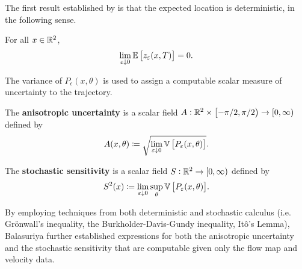 The first result established by \cite{Balasuriya_2020_StochasticSensitivityComputable} is that the expected location is deterministic, in the following sense.
\begin{theorem}
	For all \(x \in \mathbb{R}^2\),
	\[
		\lim_{\varepsilon\downarrow 0}\mathbb{E}\left[z_\varepsilon(x,T)\right] = 0.
	\]
\end{theorem}

The variance of \(P_\epsilon\left(x,\theta\right)\) is used to assign a computable scalar measure of uncertainty to the trajectory.

\begin{defn}
	\begin{alpharate}
		\item The \textbf{anisotropic uncertainty} is a scalar field \(A: \mathbb{R}^2\times\left[-\pi/2, \pi/2\right) \to [0,\infty)\) defined by
		\[
			A(x,\theta) \coloneqq \sqrt{\lim_{\varepsilon\downarrow 0}\mathbb{V}\left[P_\varepsilon(x,\theta)\right]}.
		\]

		\item The \textbf{stochastic sensitivity} is a scalar field \(S: \mathbb{R}^2 \to [0,\infty)\) defined by
		\[
			S^2(x) \coloneqq \lim_{\varepsilon\downarrow 0}\sup_{\theta}{\mathbb{V}\left[P_\varepsilon(x,\theta)\right]}.
		\]
	\end{alpharate}
\end{defn}

By employing techniques from both deterministic and stochastic calculus (i.e. Gr\"onwall's inequality, the Burkholder-Davis-Gundy inequality, It\^o's Lemma), Balasuriya further established expressions for both the anisotropic uncertainty and the stochastic sensitivity that are computable given only the flow map and velocity data.

